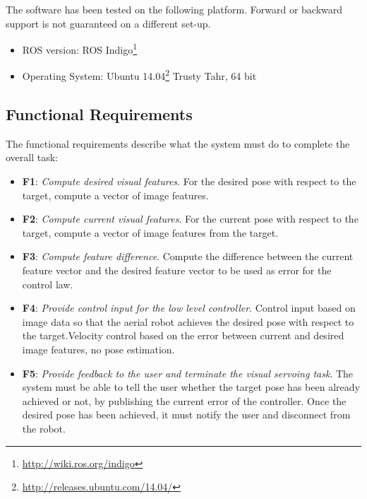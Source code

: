 The software  has been tested on the following platform. Forward or backward support is not guaranteed on a different set-up.

\begin{itemize}
	\item ROS version: ROS Indigo\footnote{\url{http://wiki.ros.org/indigo}}
	\item Operating System: Ubuntu 14.04\footnote{\url{http://releases.ubuntu.com/14.04/}} Trusty Tahr, 64 bit
\end{itemize}

\subsection{Functional Requirements}
\label{sec:functional-requirements}

The functional requirements describe what the system must do to complete the overall task:

\begin{itemize}
	\item \textbf{F1}: \emph{Compute desired visual features}. For the desired pose with respect to the target, compute a vector of image features. 
	
	\item \textbf{F2}: \emph{Compute current visual features}. For the current pose with respect to the target, compute a vector of image features from the target. 
	
	\item \textbf{F3}: \emph{Compute feature difference}. Compute the difference between the current feature vector and the desired feature vector to be used as error for the control law.		
	
	\item \textbf{F4}: \emph{Provide control input for the low level controller}. Control input based on image data so that the aerial robot achieves the desired pose with respect to the target.Velocity control based on the error between current and desired image features, no pose estimation.
	
	\item \textbf{F5}: \emph{Provide feedback to the user and terminate the visual servoing task}. The system must be able to tell the user whether the target pose has been already achieved or not, by publishing the current error of the controller. Once the desired pose has been achieved, it must notify the user and disconnect from the robot.
\end{itemize}

